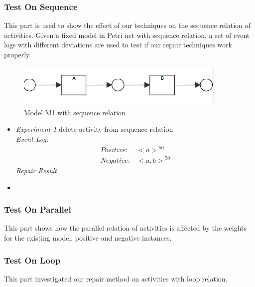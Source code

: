 \subsubsection{Test On Sequence}
This part is used to show the effect of our techniques on the sequence relation of activities. Given a fixed model in Petri net with sequence relation, a set of event logs with different deviations are used to test if our repair techniques work properly.
\begin{figure}
	\includegraphics[width=0.9\textwidth]{figures/evaluation/model_01_sequence.png}
	\caption{Model M1 with sequence relation}
	\label{fig:sequence-M1}
\end{figure} 
\begin{itemize}
	\item \emph{Experiment 1} delete activity from sequence relation \\
	
	\emph{Event Log: }
	\begin{align*}
	Positive:& {<a>}^{50} \\
	Negative:& {<a, b>}^{50}
	\end{align*}
	\emph{Repair Result}
	
	
	\item 
\end{itemize}
\subsubsection{Test On Parallel}
This part shows how the parallel relation of activities is affected by the weights for the existing model, positive and negative instances.

\subsubsection{Test On Loop}
This part investigated our repair method on activities with loop relation.

